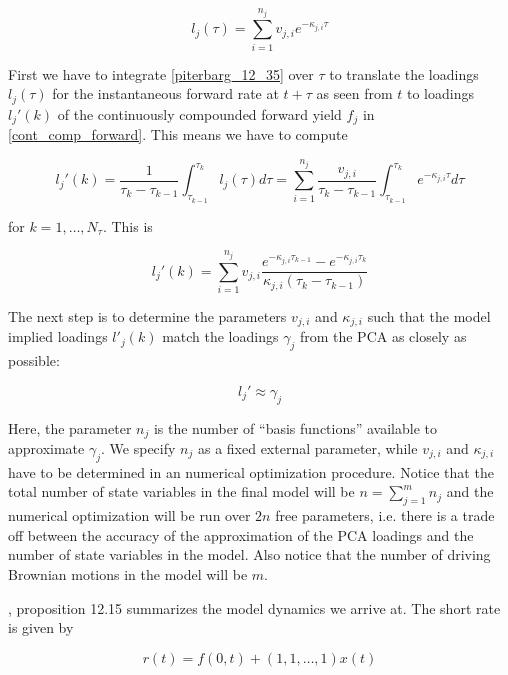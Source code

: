 \documentclass{amsart}
\theoremstyle{plain}
\numberwithin{equation}{section}
\begin{document}
\begin{equation}\label{piterbarg_12_35}
l_j(\tau) = \sum_{i=1}^{n_j} v_{j,i} e^{-\kappa_{j,i} \tau}
\end{equation}

First we have to integrate \ref{piterbarg_12_35} over $\tau$ to translate the loadings $l_j(\tau)$ for the instantaneous
forward rate at $t+\tau$ as seen from $t$ to loadings $l_j'(k)$ of the continuously compounded forward yield $f_j$ in
\ref{cont_comp_forward}. This means we have to compute

\begin{equation}
  l_j'(k) = \frac{1}{\tau_k - \tau_{k-1}} \int_{\tau_{k-1}}^{\tau_k} l_j(\tau) d \tau = \sum_{i=1}^{n_j} \frac{v_{j,i} }{\tau_k - \tau_{k-1}} \int_{\tau_{k-1}}^{\tau_k} e^{-\kappa_{j,i} \tau} d \tau
\end{equation}

for $k=1,\ldots,N_{\tau}$. This is

\begin{equation}
  l_j'(k) = \sum_{i=1}^{n_j} v_{j,i} \frac{e^{-\kappa_{j,i} \tau_{k-1}} - e^{-\kappa_{j,i} \tau_k}}{\kappa_{j,i}( \tau_k - \tau_{k-1} )}
\end{equation}

The next step is to determine the parameters $v_{j,i}$ and $\kappa_{j,i}$ such that the model implied loadings $l'_j(k)$
match the loadings $\gamma_j$ from the PCA as closely as possible:

\begin{equation}
  l_j' \approx \gamma_j
\end{equation}

Here, the parameter $n_j$ is the number of ``basis functions'' available to approximate $\gamma_j$. We specify $n_j$ as
a fixed external parameter, while $v_{j,i}$ and $\kappa_{j,i}$ have to be determined in an numerical optimization
procedure. Notice that the total number of state variables in the final model will be $n = \sum_{j=1}^m n_j$ and the
numerical optimization will be run over $2n$ free parameters, i.e. there is a trade off between the accuracy of the
approximation of the PCA loadings and the number of state variables in the model. Also notice that the number of driving
Brownian motions in the model will be $m$.

\cite{Andersen_Piterbarg_2010}, proposition 12.15 summarizes the model dynamics we arrive at. The short rate is given by

\begin{equation}
r(t) = f(0,t) + (1,1,\ldots,1) x(t)
\end{equation}
\end{document}
